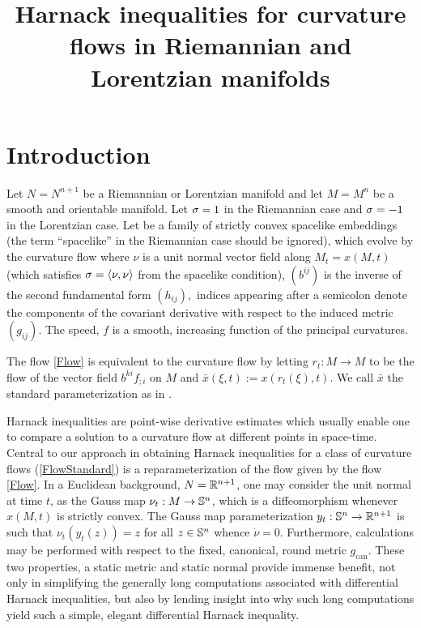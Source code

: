 



\title[Harnack inequalities for curvature flows]{Harnack inequalities for curvature flows in Riemannian and Lorentzian manifolds}

\maketitle
\section{Introduction}
\label{sec:intro}
Let $N=N^{n+1}$ be a Riemannian or Lorentzian manifold and let $M=M^{n}$ be a smooth and orientable manifold. Let $\s = 1$ in the Riemannian case and $\s = -1$ in the Lorentzian case. Let
\eq{x\cn M\x[0,T^{\ast})\ra N}
be a family of strictly convex spacelike embeddings (the term ``spacelike'' in the Riemannian case should be ignored), which evolve by the curvature flow
where $\nu$ is a unit normal vector field along $M_{t}=x(M,t)$ (which satisfies $\s=\ip{\nu}{\nu}$ from the spacelike condition), $(b^{ij})$ is the inverse of the second fundamental form $(h_{ij}),$ indices appearing after a semicolon denote the components of the covariant derivative with respect to the induced metric $(g_{ij})$. The speed, $f$ is a smooth, increasing function of the principal curvatures.

The flow \eqref{Flow} is equivalent to the curvature flow
\eq{\label{FlowStandard}
\bar{x}&:M\times [0,T^{\ast})\to N\\
\dot{\bar{x}} &= -\s \bar{f} \bar{\nu}.}
by letting \(r_t:M\to M\) to be the flow of the vector field $b^{ki}f_{;i}$ on $M$ and  $\bar{x} (\xi, t) := x (r_t(\xi), t)$. We call $\bar{x}$  the standard parameterization as in \cite{Andrews:09/1994}.

Harnack inequalities are point-wise derivative estimates which usually enable one to compare a solution to a curvature flow at different points in space-time.
Central to our approach in obtaining Harnack inequalities for a class of curvature flows (\ref{FlowStandard}) is a reparameterization of the flow given by the flow \eqref{Flow}. 
In a Euclidean background, $N = \R^{n+1}$, one may consider the unit normal at time $t$, as the Gauss map $\nu_t : M \to \S^n$, which is a diffeomorphism whenever $x(M,t)$ is strictly convex. The Gauss map parameterization $y_t: \S^n \to \R^{n+1}$ \cite{Andrews:09/1994} is such that $\nu_t(y_t(z)) = z$ for all $z \in \S^n$ whence $\dot{\nu} = 0$. Furthermore, calculations may be performed with respect to the fixed, canonical, round metric $g_{\operatorname{can}}$. These two properties, a static metric and static normal provide immense benefit, not only in simplifying the generally long computations associated with differential Harnack inequalities, but also by lending insight into why such long computations yield such a simple, elegant differential Harnack inequality.

